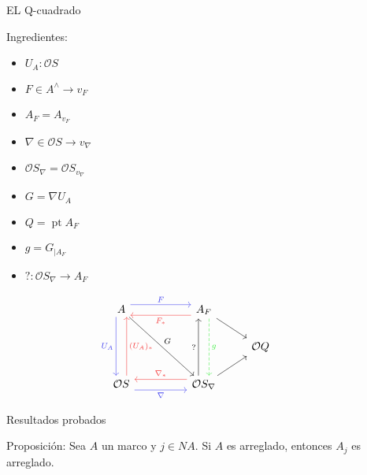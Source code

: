 \documentclass[compress,12pt]{beamer}
\DeclareMathOperator{\pt}{pt}
\begin{document}
\begin{frame}[fragile]{EL Q-cuadrado}
	\begin{block}{Ingredientes:}
		\begin{multicols}{3}
		
		 \begin{itemize}
			\item $U_A\colon \mathcal{O}S$
			\item $F\in A^\wedge \rightarrow v_F$
			\item $A_F=A_{v_F}$
			\item $\nabla\in \mathcal{O}S \rightarrow v_\nabla$
			\item $\mathcal{O}S_\nabla=\mathcal{O}S_{v_\nabla}$
			\item $G=\nabla U_A$
			\item $Q=\pt A_F$
			\item $g=G_{\mid A_F}$
			\item $?\colon \mathcal{O}S_\nabla\to A_F$
		 \end{itemize}
		
		\end{multicols}
	\end{block}
\[\begin{tikzcd}
	A && {A_F} && {} \\
	&&& {\mathcal{O}Q} \\
	{\mathcal{O}S} && {\mathcal{O}S_\nabla}
	\arrow["F", shift left=2, color={rgb,255:red,67;green,67;blue,239}, from=1-1, to=1-3]
	\arrow["{U_A}"', shift right=2, color={rgb,255:red,67;green,67;blue,239}, from=1-1, to=3-1]
	\arrow["G", from=1-1, to=3-3]
	\arrow["{F_*}", shift left=2, color={rgb,255:red,245;green,61;blue,61}, from=1-3, to=1-1]
	\arrow[from=1-3, to=2-4]
	\arrow["g", shift left=2, color={rgb,255:red,69;green,237;blue,72}, dashed, from=1-3, to=3-3]
	\arrow["{(U_A)_*}"', shift right=2, color={rgb,255:red,245;green,61;blue,61}, from=3-1, to=1-1]
	\arrow["\nabla"', shift right=2, color={rgb,255:red,67;green,67;blue,239}, from=3-1, to=3-3]
	\arrow["{?}", shift left=2, from=3-3, to=1-3]
	\arrow[from=3-3, to=2-4]
	\arrow["{\nabla_*}"', shift right=2, color={rgb,255:red,245;green,61;blue,61}, from=3-3, to=3-1]
\end{tikzcd}\]
\end{frame}

\begin{frame}{Resultados probados}
\begin{block}{Proposición:}
    Sea $A$ un marco y $j\in NA$. Si $A$ es arreglado, entonces $A_j$ es arreglado.
\end{block}
\end{frame}
\end{document}
